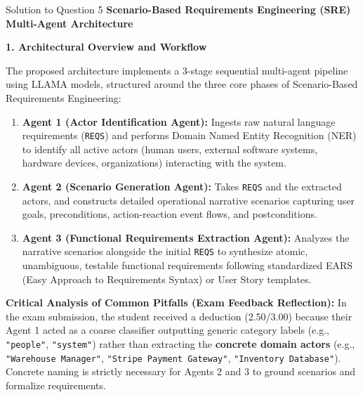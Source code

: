 \documentclass[11pt,a4paper]{article}
\begin{document}
\begin{solutionbox}{Solution to Question 5}
\textbf{Scenario-Based Requirements Engineering (SRE) Multi-Agent Architecture}

\medskip
\textbf{1. Architectural Overview and Workflow}

The proposed architecture implements a 3-stage sequential multi-agent pipeline using LLAMA models, structured around the three core phases of Scenario-Based Requirements Engineering:
\begin{center}
\begin{tikzpicture}[node distance=1.5cm, auto, >=stealth]
\end{tikzpicture}
\end{center}
\begin{enumerate}[label=\textbf{Stage \arabic*:}, leftmargin=2cm]
    \item \textbf{Agent 1 (Actor Identification Agent):} Ingests raw natural language requirements (\texttt{REQS}) and performs Domain Named Entity Recognition (NER) to identify all active actors (human users, external software systems, hardware devices, organizations) interacting with the system.
    \item \textbf{Agent 2 (Scenario Generation Agent):} Takes \texttt{REQS} and the extracted actors, and constructs detailed operational narrative scenarios capturing user goals, preconditions, action-reaction event flows, and postconditions.
    \item \textbf{Agent 3 (Functional Requirements Extraction Agent):} Analyzes the narrative scenarios alongside the initial \texttt{REQS} to synthesize atomic, unambiguous, testable functional requirements following standardized EARS (Easy Approach to Requirements Syntax) or User Story templates.
\end{enumerate}

\medskip
\textbf{Critical Analysis of Common Pitfalls (Exam Feedback Reflection):}
In the exam submission, the student received a deduction (2.50/3.00) because their Agent 1 acted as a coarse classifier outputting generic category labels (e.g., \texttt{"people"}, \texttt{"system"}) rather than extracting the \textbf{concrete domain actors} (e.g., \texttt{"Warehouse Manager"}, \texttt{"Stripe Payment Gateway"}, \texttt{"Inventory Database"}). Concrete naming is strictly necessary for Agents 2 and 3 to ground scenarios and formalize requirements.


\end{solutionbox}
\end{document}
